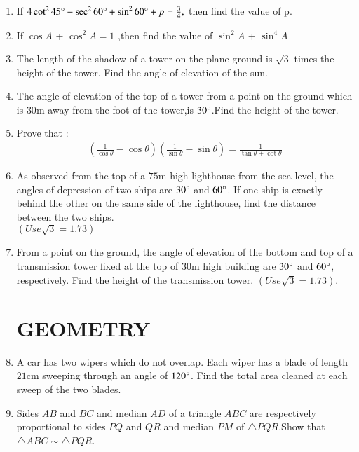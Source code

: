 \documentclass[12pt,-letter paper]{article}
\providecommand{\brak}[1]{\ensuremath{\left(#1\right)}}
\begin{document}
\begin{enumerate}
\item If $4 \cot^{2}45\degree-\sec^{2}60\degree+\sin^{2}60\degree+p=\frac{3}{4},$ then find the value of p.

\item If $\cos A$ + $\cos^{2}A = 1$ ,then find the value of $\sin^{2}A$ + $\sin^{4}A$

\item The length of the shadow of a tower on the plane ground is $ \sqrt3 $ times the height of the tower. Find the angle of elevation of the sun.

\item The angle of elevation of the top of a tower from a point on the ground which is $30 \mathrm{m}$ away from the foot of the tower,is $30\degree$.Find the height of the tower.

\item Prove that :
\begin{align}
	\brak{\frac{1}{\cos\theta}-\cos\theta} \brak{\frac{1}{\sin\theta}-\sin\theta} = \frac{1}{\tan\theta + \cot\theta}
\end{align}

\item As observed from the top of a $75 \mathrm{m}$ high lighthouse from the sea-level, the angles of depression of two ships are $30\degree$ and $60\degree$. If one ship is exactly behind the other on the same side of the lighthouse, find the distance between the two ships.\\
	$\brak{Use \sqrt{3} = 1.73}$

\item From a point on the ground, the angle of elevation of the bottom and top of a transmission tower fixed at the top of $30 \mathrm{m}$ high building are $30\degree$ and $60\degree$, respectively. Find the height of the transmission tower. $\brak{Use\sqrt{3} = 1.73}$.

\begin{center}
    \section*{GEOMETRY}
\end{center}

\item A car has two wipers which do not overlap. Each wiper has a blade of length $21 \mathrm{cm}$ sweeping through an angle of $120\degree$. Find the total area cleaned at each sweep of the two blades.

\item Sides $AB$ and $BC$ and median $AD$ of a triangle $ABC$ are respectively proportional to sides $PQ$ and $QR$ and median $PM$ of $\triangle PQR$.Show that $\triangle ABC \sim \triangle PQR$.


\end{enumerate}
\end{document}
